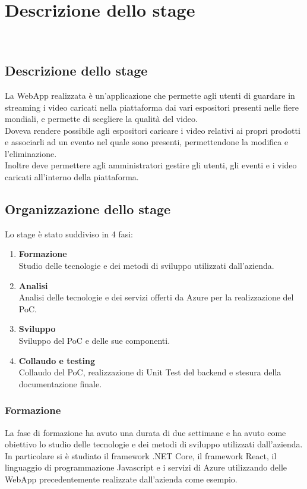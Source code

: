 \chapter{Descrizione dello stage}
\label{cap:analisi-requisiti}
\\
\section{Descrizione dello stage}
\label{sec:descrizione-stage}
La WebApp realizzata è un'applicazione che permette agli utenti di guardare in streaming i video caricati nella piattaforma dai vari espositori presenti nelle fiere mondiali, e permette di scegliere la qualità del video.\\
Doveva rendere possibile agli espositori caricare i video relativi ai propri prodotti e associarli ad un evento nel quale sono presenti, permettendone la modifica e l'eliminazione.\\
Inoltre deve permettere agli amministratori gestire gli utenti, gli eventi e i video caricati all'interno della piattaforma.\\

\section{Organizzazione dello stage}
\label{sec:organizzazione-stage}
Lo stage è stato suddiviso in 4 fasi:
\begin{enumerate}
    \item \textbf{Formazione} \\
    Studio delle tecnologie e dei metodi di sviluppo utilizzati dall'azienda.
    \item \textbf{Analisi} \\
    Analisi delle tecnologie e dei servizi offerti da Azure per la realizzazione del PoC.
    \item \textbf{Sviluppo} \\
    Sviluppo del PoC e delle sue componenti.
    \item \textbf{Collaudo e testing} \\
    Collaudo del PoC, realizzazione di Unit Test del backend e stesura della documentazione finale.
\end{enumerate}

\subsection{Formazione}
\label{subsec:formazione}
La fase di formazione ha avuto una durata di due settimane e ha avuto come obiettivo lo studio delle tecnologie e dei metodi di sviluppo utilizzati dall'azienda.\\
In particolare si è studiato il framework .NET Core, il framework React, il linguaggio di programmazione Javascript e i servizi di Azure utilizzando delle WebApp precedentemente realizzate dall'azienda come esempio.\\


